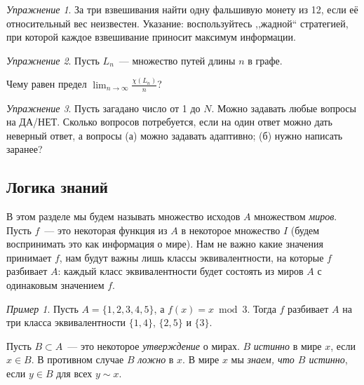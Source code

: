 \documentclass[12pt]{article}
\theoremstyle{definition}
\theoremstyle{plain}
\theoremstyle{remark}
\newtheorem{example}{Пример}[section]
\newtheorem{exercise}{Упражнение}[section]
\begin{document}
\begin{exercise}
За три взвешивания найти одну фальшивую монету из 12, если её относительный вес неизвестен. Указание: воспользуйтесь ,,жадной`` стратегией, при которой каждое взвешивание приносит максимум информации.
\end{exercise}

\begin{exercise}
Пусть \(L_n\)~— множество путей длины \(n\) в графе.
\begin{center}
\end{center}
Чему равен предел \(\lim_{n\to\infty} \frac{\chi(L_n)}{n}\)?
\end{exercise}

\begin{exercise}
Пусть загадано число от 1 до \(N\). Можно задавать любые вопросы на ДА/НЕТ. Сколько вопросов потребуется, если на один ответ можно дать неверный ответ, а вопросы (а) можно задавать адаптивно; (б) нужно написать заранее?
\end{exercise}

\subsection{Логика знаний}
В этом разделе мы будем называть множество исходов $A$ множеством \emph{миров}.
Пусть $f$~--- это некоторая функция из $A$ в некоторое множество $I$ (будем воспринимать это как информация о мире).
Нам не важно какие значения принимает $f$, нам будут важны лишь классы эквивалентности, на которые $f$ разбивает $A$:
каждый класс эквивалентности будет состоять из миров $A$ с одинаковым значением $f$.

\begin{example}
    Пусть $A = \{1,2,3,4,5\}$, а $f(x) = x \bmod 3$. Тогда $f$ разбивает $A$ на три класса эквивалентности 
    $\{1,4\}$, $\{2,5\}$ и $\{3\}$.
\end{example}

Пусть $B\subset A$~--- это некоторое \emph{утверждение} о мирах. $B$ \emph{истинно} в мире $x$, если $x\in B$.
В противном случае $B$ \emph{ложно} в $x$. В мире $x$ мы \emph{знаем, что $B$ истинно}, если $y \in B$ для всех 
$y\sim x$.
\end{document}
